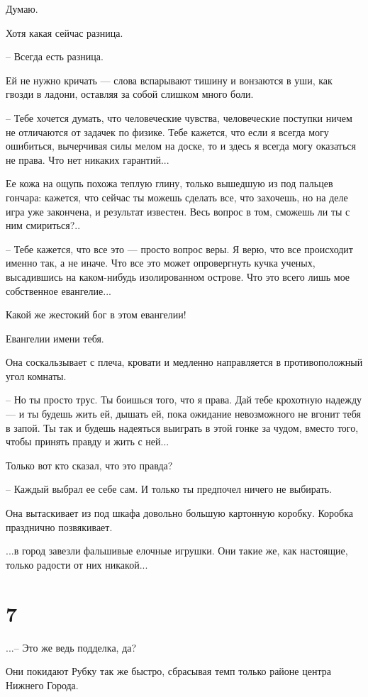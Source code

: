\documentclass[a5paper]{article}
\begin{document}
Думаю.

Хотя какая сейчас разница.

-- Всегда есть разница.

Ей не нужно кричать --- слова вспарывают тишину и вонзаются в уши, как гвозди в ладони, оставляя за собой слишком много боли.

-- Тебе хочется думать, что человеческие чувства, человеческие поступки ничем не отличаются от задачек по физике. Тебе кажется, что если я всегда могу ошибиться, вычерчивая силы мелом на доске, то и здесь я всегда могу оказаться не права. Что нет никаких гарантий...

Ее кожа на ощупь похожа теплую глину, только вышедшую из под пальцев гончара: кажется, что сейчас ты можешь сделать все, что захочешь, но на деле игра уже закончена, и результат известен. Весь вопрос в том, сможешь ли ты с ним смириться?..

-- Тебе кажется, что все это --- просто вопрос веры. Я верю, что все происходит именно так, а не иначе. Что все это может опровергнуть кучка ученых, высадившись на каком-нибудь изолированном острове. Что это всего лишь мое собственное евангелие...

Какой же жестокий бог в этом евангелии!

Евангелии имени тебя.

Она соскальзывает с плеча, кровати и медленно направляется в противоположный угол комнаты.

-- Но ты просто трус. Ты боишься того, что я права. Дай тебе крохотную надежду --- и ты будешь жить ей, дышать ей, пока ожидание невозможного не вгонит тебя в запой. Ты так и будешь надеяться выиграть в этой гонке за чудом, вместо того, чтобы принять правду и жить с ней...

Только вот кто сказал, что это правда?

-- Каждый выбрал ее себе сам. И только ты предпочел ничего не выбирать.

Она вытаскивает из под шкафа довольно большую картонную коробку. Коробка празднично позвякивает.

...в город завезли фальшивые елочные игрушки. Они такие же, как настоящие, только радости от них никакой...

\section*{7}

...-- Это же ведь подделка, да?

Они покидают Рубку так же быстро, сбрасывая темп только районе центра Нижнего Города.
\end{document}
